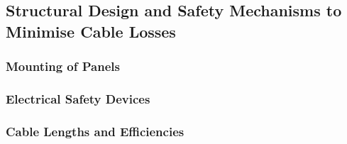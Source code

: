 \subsection{Structural Design and Safety Mechanisms to Minimise Cable Losses}

\subsubsection{Mounting of Panels}

\paragraph{}

\subsubsection{Electrical Safety Devices}

\paragraph{}

\subsubsection{Cable Lengths and Efficiencies}

\paragraph{}